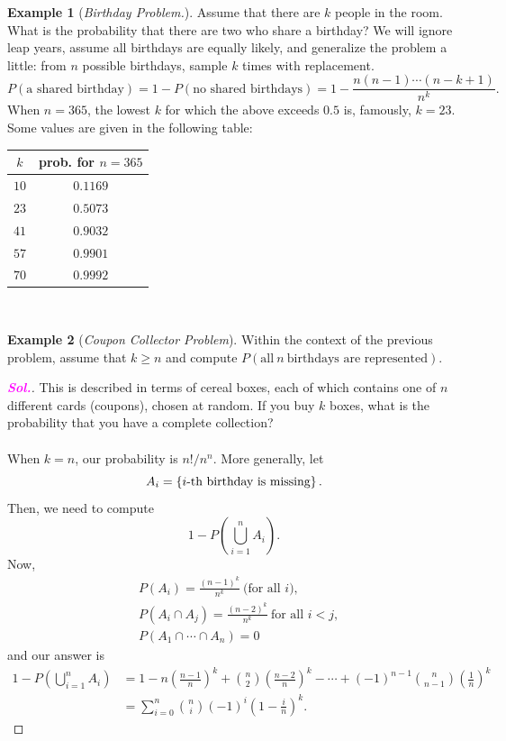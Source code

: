 \documentclass[12pt,a4paper]{article}
\theoremstyle{definition}
\newtheorem{example}{Example}[section]
\theoremstyle{definition}
\theoremstyle{definition}
\theoremstyle{definition}
\theoremstyle{remark}
\theoremstyle{definition}
\newcommand{\sol}{\textcolor{magenta}{\bf \textit{Sol.}}\quad}
\begin{document}
\begin{example}[\it Birthday Problem.]
	Assume that there are $k$ people in the room. What is the probability that there are two who share a birthday? We will ignore leap years, assume all birthdays are equally likely, and generalize the problem a little: from $n$ possible birthdays, sample $k$ times with replacement. \[
	P(\text{a shared birthday})=1-P(\text{no shared birthdays})=1-\frac{n(n-1)\cdots(n-k+1)}{n^k}.
	\] When $n=365$, the lowest $k$ for which the above exceeds $0.5$ is, famously, $k=23$. Some values are given in the following table: \begin{table}[h!]
		\centering\begin{tabular}{c|c}
			$k$ & prob. for $n=365$ \\
			\hline
			$10$ & $0.1169$ \\
			$23$ & $0.5073$ \\
			$41$ & $0.9032$ \\
			$57$ & $0.9901$ \\
			$70$ & $0.9992$ \\
		\end{tabular}
	\end{table}
\end{example}
\
\begin{example}[\it Coupon Collector Problem]
	Within the context of the previous problem, assume that $k\geq n$ and compute $P(\text{all}\ n\ \text{birthdays are represented})$.\begin{proof}[\sol]
		This is described in terms of cereal boxes, each of which contains one of $n$ different cards (coupons), chosen at random. If you buy $k$ boxes, what is the probability that you have a complete collection?\\
		\\
		When $k=n$, our probability is $n!/n^n$. More generally, let \[
		A_i=\set{\text{$i$-th birthday is missing}}.
		\] Then, we need to compute \[
		1-P\left(\bigcup_{i=1}^nA_i\right).
		\] Now, \begin{align*}
		&P(A_i)=\frac{(n-1)^k}{n^k}\ \text{(for all $i$)},\\
		&P(A_i\cap A_j)=\frac{(n-2)^k}{n^k}\ \text{for all $i<j$}, \\
		&P(A_1\cap\cdots\cap A_n)=0
		\end{align*} and our answer is \begin{align*}
		1-P\left(\bigcup_{i=1}^nA_i\right)&=1-n\left(\frac{n-1}{n}\right)^k+\binom{n}{2}\left(\frac{n-2}{n}\right)^k-\cdots+(-1)^{n-1}\binom{n}{n-1}\left(\frac{1}{n}\right)^k \\
		&=\sum_{i=0}^n\binom{n}{i}(-1)^i\left(1-\frac{i}{n}\right)^k.
		\end{align*}
	\end{proof}
\end{example}
\end{document}
